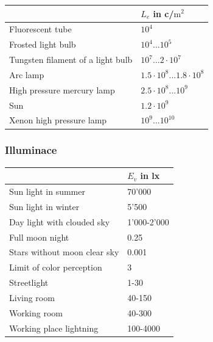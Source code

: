 \begin{table}[ht]
	\centering
	\begin{tabular}{ |p{13cm} p{3cm}|  }
		\hline
		& $L_e$ in c/$\text{m}^2$\\
		
		
		\hline
		Fluorescent tube					& $10^4$\\
		Frosted light bulb					& $10^4...10^5$\\
		Tungsten filament of a light bulb	& $10^7...2\cdot 10^7$\\
		Arc lamp							& $1.5\cdot10^8...1.8\cdot10^8$\\
		High pressure mercury lamp			& $2.5\cdot10^8...10^9$\\
		Sun									& $1.2\cdot10^9$\\
		Xenon high pressure lamp			& $10^9...10^10$\\
		
		\hline
	\end{tabular}
\end{table}



\subsubsection{Illuminace }
\begin{table}[ht]
	\centering
	\begin{tabular}{ |p{12cm} p{3cm}|  }
		\hline
		& $E_v$ in lx\\
		
		
		\hline
		Sun light in summer					& 70'000\\
		Sun light in winter					& 5'500\\
		Day light with clouded sky			& 1'000-2'000\\
		Full moon night						& 0.25\\
		Stars without moon clear sky		& 0.001\\
		Limit of color perception			& 3\\
		Streetlight							& 1-30\\
		Living room							& 40-150\\
		Working room						& 40-300\\
		Working place lightning				& 100-4000\\
		
		\hline
	\end{tabular}
\end{table}




